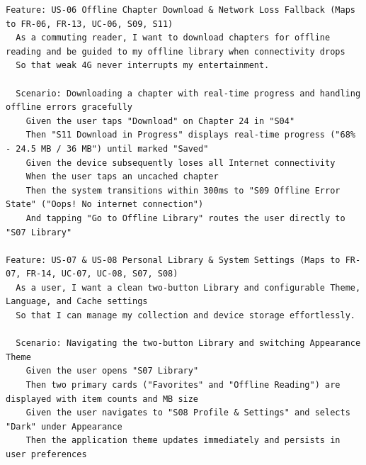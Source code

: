 \begin{lstlisting}[language=gherkin,caption={US-06, US-07 \& US-08: Offline Downloads, Network Fallback, Library, and Settings.}]
Feature: US-06 Offline Chapter Download & Network Loss Fallback (Maps to FR-06, FR-13, UC-06, S09, S11)
  As a commuting reader, I want to download chapters for offline reading and be guided to my offline library when connectivity drops
  So that weak 4G never interrupts my entertainment.

  Scenario: Downloading a chapter with real-time progress and handling offline errors gracefully
    Given the user taps "Download" on Chapter 24 in "S04"
    Then "S11 Download in Progress" displays real-time progress ("68% - 24.5 MB / 36 MB") until marked "Saved"
    Given the device subsequently loses all Internet connectivity
    When the user taps an uncached chapter
    Then the system transitions within 300ms to "S09 Offline Error State" ("Oops! No internet connection")
    And tapping "Go to Offline Library" routes the user directly to "S07 Library"

Feature: US-07 & US-08 Personal Library & System Settings (Maps to FR-07, FR-14, UC-07, UC-08, S07, S08)
  As a user, I want a clean two-button Library and configurable Theme, Language, and Cache settings
  So that I can manage my collection and device storage effortlessly.

  Scenario: Navigating the two-button Library and switching Appearance Theme
    Given the user opens "S07 Library"
    Then two primary cards ("Favorites" and "Offline Reading") are displayed with item counts and MB size
    Given the user navigates to "S08 Profile & Settings" and selects "Dark" under Appearance
    Then the application theme updates immediately and persists in user preferences
\end{lstlisting}
